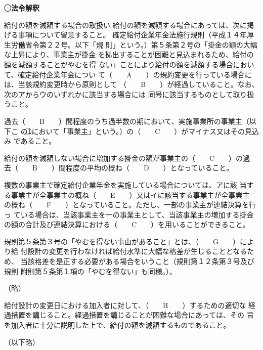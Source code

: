 \begin{fillblank}[数理人試験 \ H28 \ 問題1 \ 設問1（改題）]
  \noindent \textbf{◯法令解釈}
  \begin{lawstructure}
    \begin{lawarticle}{}{}
      給付の額を減額する場合の取扱い
      給付の額を減額する場合にあっては、次に掲げる事項について留意すること。
        確定給付企業年金法施行規則（平成１４年厚生労働省令第２２号。以下「規
        則」という。）第５条第２号の「掛金の額の大幅な上昇により、事業主が掛金
        を拠出することが困難と見込まれるため、給付の額を減額することがやむを得
        ない」ことにより給付の額を減額する場合において、確定給付企業年金につい
        て（　　A　　）の規約変更を行っている場合には、当該規約変更時から原則として
        （　　B　　）が経過していること。なお、次のアからウのいずれかに該当する場合には
        同号に該当するものとして取り扱うこと。

        過去（　　B　　）間程度のうち過半数の期において、実施事業所の事業主（以下こ
        の\textcircled{1}において「事業主」という。）の（　　C　　）がマイナス又はその見込み
        であること。

        給付の額を減額しない場合に増加する掛金の額が事業主の（　　C　　）の過
        去（　　B　　）間程度の平均の概ね（　　D　　）となっていること。
        
        複数の事業主で確定給付企業年金を実施している場合については、アに該
        当する事業主が全事業主の概ね（　　E　　）又はイに該当する事業主が全事業主
        の概ね（　　F　　）となっていること。ただし、一部の事業主が連結決算を行っ
        ている場合は、当該事業主を一の事業主として、当該事業主の増加する掛金
        の額の合計及び連結決算における（　　C　　）を用いることができること。


        規則第５条第３号の「やむを得ない事由があること」とは、（　　G　　）により給
        付設計の変更を行わなければ給付水準に大幅な格差が生じることとなるため、
        当該格差を是正する必要がある場合をいうこと（規則第１２条第３号及び規則
        附則第５条第１項の「やむを得ない」も同様。）。

        （略）

        給付設計の変更日における加入者に対して、（　　H　　）するための適切な
        経過措置を講じること。経過措置を講じることが困難な場合にあっては、その
        旨を加入者に十分に説明した上で、給付の額を減額するものであること。


        （以下略）

    \end{lawarticle}
  \end{lawstructure}
\end{fillblank}

